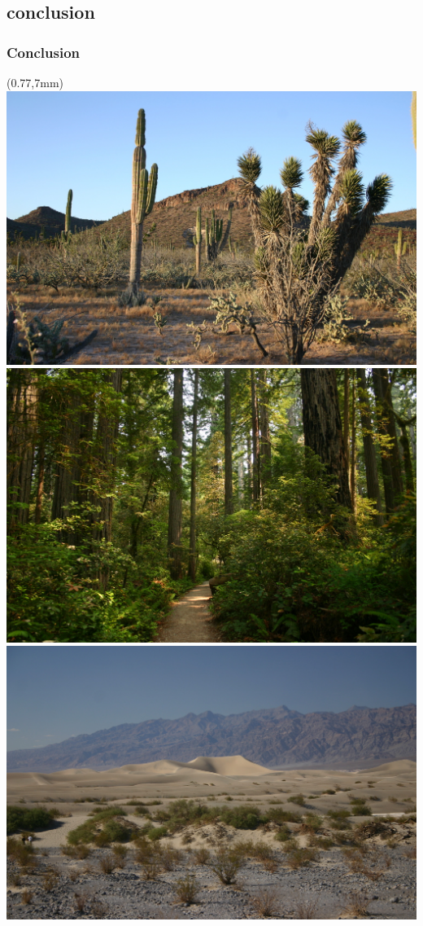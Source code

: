 \documentclass{beamer}
\begin{document}
\subsection{conclusion}
\begin{frame}
  \frametitle{Conclusion}

  \begin{textblock*}{4.5cm}(0.77\textwidth,7mm)%
    \includegraphics[width=\textwidth]{figs/random/desert1.jpg}\\[-2pt]
    \includegraphics[width=\textwidth]{figs/random/forest1.jpg}\\[-2pt]
    \includegraphics[width=\textwidth]{figs/random/desert4.jpg}
  \end{textblock*}


\end{frame}
\end{document}
